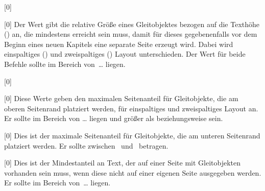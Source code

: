 \begin{Declaration}{}[0\floatpagefraction]
\begin{Declaration}{}[0\dblfloatpagefraction]
\printdeclarationlist%
%
Der Wert gibt die relative Größe eines Gleitobjektes bezogen auf die Texthöhe 
() an, die mindestens erreicht sein muss, damit für dieses 
gegebenenfalls vor dem Beginn eines neuen Kapitels eine separate Seite erzeugt 
wird. Dabei wird einspaltiges () und zweispaltiges 
() Layout unterschieden. Der Wert für beide 
Befehle sollte im Bereich von~\dots{} liegen.
\end{Declaration}
\end{Declaration}

\begin{Declaration}{}[0\topfraction]
\begin{Declaration}{}[0\dbltopfraction]
\printdeclarationlist%
%
Diese Werte geben den maximalen Seitenanteil für Gleitobjekte, die am oberen 
Seitenrand platziert werden, für einspaltiges und zweispaltiges Layout an. Er 
sollte im Bereich von \dots{} liegen und größer als 
 beziehungsweise  sein.
\end{Declaration}
\end{Declaration}

\begin{Declaration}{}[0\bottomfraction]
\printdeclarationlist%
%
Dies ist der maximale Seitenanteil für Gleitobjekte, die am unteren Seitenrand 
platziert werden. Er sollte zwischen~ und~ betragen.
\end{Declaration}

\begin{Declaration}{}[0\textfraction]
\printdeclarationlist%
%
Dies ist der Mindestanteil an Text, der auf einer Seite mit Gleitobjekten 
vorhanden sein muss, wenn diese nicht auf einer eigenen Seite ausgegeben 
werden. Er sollte im Bereich von~\dots{} liegen.
\end{Declaration}

